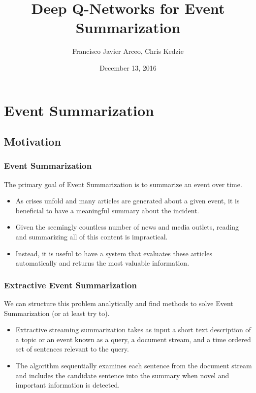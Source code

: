 \documentclass[]{beamer}
\begin{document}
\title{Deep Q-Networks for Event Summarization}  
\author{Francisco Javier Arceo, Chris Kedzie}
\date{December 13, 2016}



\begin{frame}
\titlepage
\end{frame}

\begin{frame}
	\tableofcontents
\end{frame}


\section{Event Summarization}
	\subsection{Motivation}
\begin{frame}
	\frametitle{Event Summarization} 
	The primary goal of Event Summarization is to summarize an event over time.
	\begin{itemize}
	\item<2-> 	As crises unfold and many articles are generated about a given event, it is beneficial to have a meaningful summary about the incident. 
	\item<2-> Given the seemingly countless number of news and media outlets, reading and summarizing all of this content is impractical. 
	\item<2-> 	Instead, it is useful to have a system that evaluates these articles automatically and returns the most valuable information.
	\end{itemize}
\end{frame}
\begin{frame}
	\frametitle{Extractive Event Summarization} 
	We can structure this problem analytically and find methods to solve Event Summarization (or at least try to). 
	\begin{itemize}
	\item<2-> 	Extractive streaming summarization takes as input a short text description of a topic or an event known as a query, a document stream, and a time ordered set of sentences relevant to the query. 
	\item<2-> The algorithm sequentially examines each sentence from the document stream and includes the candidate sentence into the summary when novel and important information is detected. 
	\end{itemize}
\end{frame}
\end{document}
